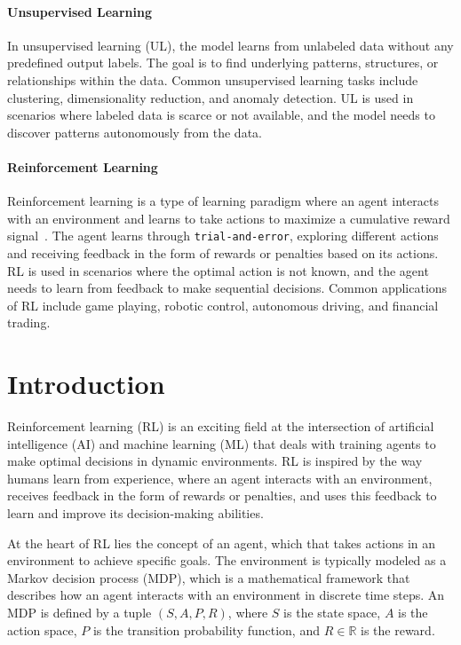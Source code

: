 \documentclass[../xlapes02]{subfiles}
\begin{document}
    \paragraph{Unsupervised Learning}
    In unsupervised learning (UL), the model learns from unlabeled data without any predefined output labels.
    The goal is to find underlying patterns, structures, or relationships within the data.
    Common unsupervised learning tasks include clustering, dimensionality reduction, and anomaly detection.
    UL is used in scenarios where labeled data is scarce or not available, and the model needs to discover patterns autonomously from the data.

    \paragraph{Reinforcement Learning}
    Reinforcement learning is a type of learning paradigm where an agent interacts with an environment and learns to take actions to maximize a cumulative reward signal~\cite{sutton2018reinforcement}.
    The agent learns through \texttt{trial-and-error}, exploring different actions and receiving feedback in the form of rewards or penalties based on its actions.
    RL is used in scenarios where the optimal action is not known, and the agent needs to learn from feedback to make sequential decisions.
    Common applications of RL include game playing, robotic control, autonomous driving, and financial trading.


    \section{Introduction}\label{sec:rl-introduction}
    Reinforcement learning (RL) is an exciting field at the intersection of artificial intelligence (AI) and machine learning (ML) that deals with training agents to make optimal decisions in dynamic environments.
    RL is inspired by the way humans learn from experience, where an agent interacts with an environment, receives feedback in the form of rewards or penalties, and uses this feedback to learn and improve its decision-making abilities.

    At the heart of RL lies the concept of an agent, which that takes actions in an environment to achieve specific goals.
    The environment is typically modeled as a Markov decision process (MDP), which is a mathematical framework that describes how an agent interacts with an environment in discrete time steps.
    An MDP is defined by a tuple $(S, A, P, R)$, where $S$ is the state space, $A$ is the action space, $P$ is the transition probability function, and $R\in\mathbb{R}$ is the reward.
\end{document}
